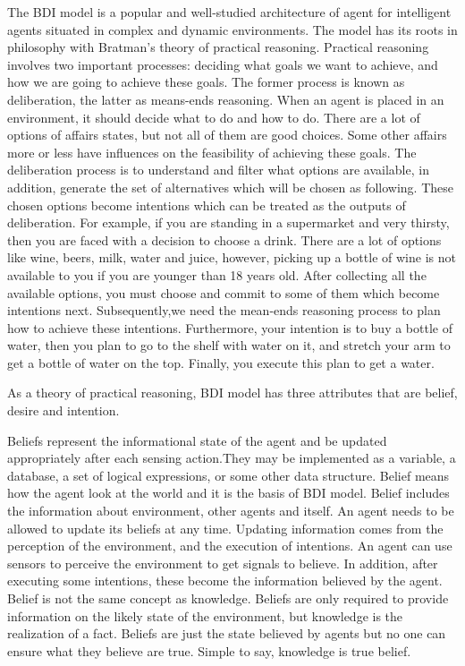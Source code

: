 The BDI model is a popular and well-studied architecture of agent for intelligent agents situated in complex and dynamic environments. The model has its roots in philosophy with Bratman’s theory of practical reasoning\cite{Sebastian_Hierarchical_2006}. Practical reasoning involves two important processes: deciding what goals we want to achieve, and how we are going to achieve these goals. The former process is known as deliberation, the latter as means-ends reasoning\cite{Gerhard_MultiSystem_1999}. When an agent is placed in an environment, it should decide what to do and how to do. There are a lot of options of affairs states, but not all of them are good choices. Some other affairs more or less have influences on the feasibility of achieving these goals. The deliberation process is to understand and filter what options are available, in addition, generate the set of alternatives which will be chosen as following. These chosen options become intentions which can be treated as the outputs of deliberation. For example, if you are standing in a supermarket and very thirsty, then you are faced with a decision to choose a drink. There are a lot of options like wine, beers, milk, water and juice, however, picking up a bottle of wine is not available to you if you are younger than 18 years old. After collecting all the available options, you must choose and commit to some of them which become intentions next. Subsequently,we need the mean-ends reasoning process to plan how to achieve these intentions. Furthermore, your intention is to buy a bottle of water, then you plan to go to the shelf with water on it, and stretch your arm to get a bottle of water on the top. Finally, you execute this plan to get a water.

As a theory of practical reasoning, BDI model has three attributes that are belief, desire and intention.

Beliefs represent the informational state of the agent and be updated appropriately after each sensing action.They may be implemented as a variable, a database, a set of logical expressions, or some other data structure\cite{Rao_BDITheory_1995}. Belief means how the agent look at the world and it is the basis of BDI model. Belief includes the information about environment, other agents and itself. An agent needs to be allowed to update its beliefs at any time. Updating information comes from the perception of the environment, and the execution of intentions. An agent can use sensors to perceive the environment to get signals to believe. In addition, after executing some intentions, these become the information believed by the agent. Belief is not the same concept as knowledge. Beliefs are only required to provide information on the likely state of the environment, but knowledge is the realization of a fact. Beliefs are just the state believed by agents but no one can ensure what they believe are true. Simple to say, knowledge is true belief. 

